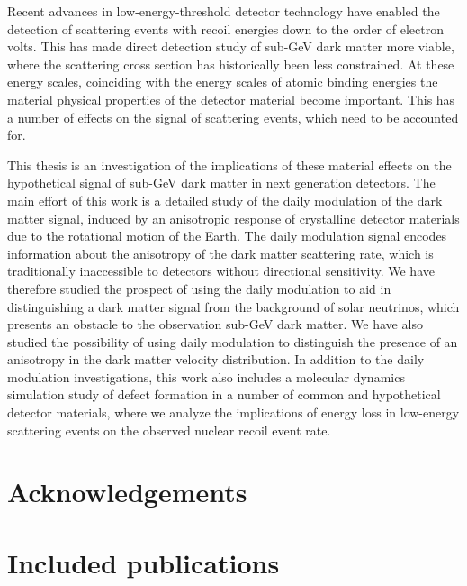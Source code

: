 Recent advances in low-energy-threshold detector technology have enabled the detection of scattering events with recoil energies down to the order of electron volts. This has made direct detection study of sub-GeV dark matter more viable, where the scattering cross section has historically been less constrained. At these energy scales, coinciding with the energy scales of atomic binding energies the material physical properties of the detector material become important. This has a number of effects on the signal of scattering events, which need to be accounted for.

This thesis is an investigation of the implications of these material effects on the hypothetical signal of sub-GeV dark matter in next generation detectors. The main effort of this work is a detailed study of the daily modulation of the dark matter signal, induced by an anisotropic response of crystalline detector materials due to the rotational motion of the Earth. The daily modulation signal encodes information about the anisotropy of the dark matter scattering rate, which is traditionally inaccessible to detectors without directional sensitivity. We have therefore studied the prospect of using the daily modulation to aid in distinguishing a dark matter signal from the background of solar neutrinos, which presents an obstacle to the observation sub-GeV dark matter. We have also studied the possibility of using daily modulation to distinguish the presence of an anisotropy in the dark matter velocity distribution. In addition to the daily modulation investigations, this work also includes a molecular dynamics simulation study of defect formation in a number of common and hypothetical detector materials, where we analyze the implications of energy loss in low-energy scattering events on the observed nuclear recoil event rate.

\chapter{Acknowledgements}





\chapter{Included publications}

